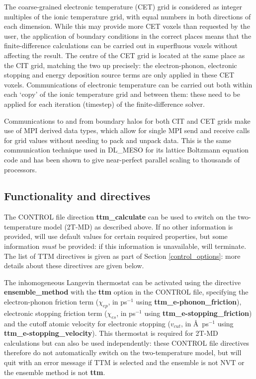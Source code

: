 The coarse-grained electronic temperature (CET) grid is considered as
integer multiples of the ionic temperature grid, with equal numbers in both
directions of each dimension. While this may provide more CET voxels than
requested by the user, the application of boundary conditions in the correct
places means that the finite-difference calculations can be carried out in
superfluous voxels without affecting the result. The centre of the CET grid is
located at the same place as the CIT grid, matching the two up precisely: the
electron-phonon, electronic stopping and energy deposition source terms are
only applied in these CET voxels. Communications of electronic temperature
can be carried out both within each `copy' of the ionic temperature grid and
between them: these need to be applied for each iteration (timestep) of the
finite-difference solver.

Communications to and from boundary halos for both CIT and CET grids
make use of MPI derived data types, which allow for single MPI send and
receive calls for grid values without needing to pack and unpack data. This
is the same communication technique used in DL\_MESO for its lattice
Boltzmann equation code\cite{seaton-13a} and has been shown to give
near-perfect parallel scaling to thousands of processors.

\subsection*{Functionality and directives}

The CONTROL file direction {\bf ttm\_calculate} can be used to switch on
the two-temperature model (2T-MD) as described above. If no other
information is provided, \D will use default values for certain required
properties, but some information {\em must} be provided: if this information
is unavailable, \D will terminate. The list of TTM directives is given as part of
Section \ref{control_options}: more details about these directives are given
below.

The inhomogeneous Langevin thermostat can be activated using the
directive {\bf ensemble\_method} with the {\bf ttm} option in the
CONTROL file, specifying the electron-phonon friction term ($\chi_{ep}$,
in ps$^{-1}$ using {\bf ttm\_e-phonon\_friction}), electronic stopping friction 
term ($\chi_{es}$, in ps$^{-1}$ using {\bf ttm\_e-stopping\_friction})
and the cutoff atomic velocity for electronic stopping ($v_{cut}$, in
\AA~ps$^{-1}$ using {\bf ttm\_e-stopping\_velocity}). This thermostat is 
required for 2T-MD calculations but can also be used independently: these 
CONTROL file directives therefore do not automatically switch on the 
two-temperature model, but \D will quit with an error message if TTM is selected
and the ensemble is not NVT or the ensemble method is not {\bf ttm}.

